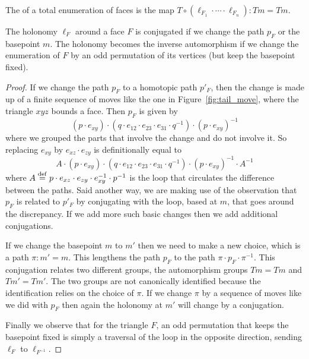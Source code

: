 \begin{mydef}
The  of a total enumeration of faces is the map \( T\circ(\ell_{F_1}\cdot\cdots\cdot\ell_{F_n}):Tm=Tm  \).
\end{mydef}

\begin{myprop}
The holonomy \( \ell_F \) around a face \( F \) is conjugated if we change the path \( p_F \) or the basepoint \( m \). The holonomy becomes the inverse automorphism if we change the enumeration of \( F \) by an odd permutation of its vertices (but keep the basepoint fixed).
\end{myprop}
\begin{proof}
If we change the path \( p_F \) to a homotopic path \( p'_F \), then the change is made up of a finite sequence of moves like the one in Figure~\ref{fig:tail_move}, where the triangle \( xyz \) bounds a face. Then \( p_{F} \) is given by 
\[ (p\cdot e_{xy})\cdot (q\cdot e_{12}\cdot e_{23}\cdot e_{31}\cdot q^{-1})\cdot (p\cdot e_{xy})^{-1}\] 
where we grouped the parts that involve the change and do not involve it. So replacing \( e_{xy} \) by \( e_{xz}\cdot e_{zy} \) is definitionally equal to 
\[ A\cdot (p\cdot e_{xy})\cdot (q\cdot e_{12}\cdot e_{23}\cdot e_{31}\cdot q^{-1})\cdot (p\cdot e_{xy})^{-1}\cdot A^{-1}\] 
where \( A\stackrel{\mathrm{def}}{=} p\cdot e_{xz}\cdot e_{zy}\cdot e_{xy}^{-1}\cdot p^{-1} \) is the loop that circulates the difference between the paths. Said another way, we are making use of the observation that \( p_F \) is related to \( p'_F \) by conjugating with the loop, based at \( m \), that goes around the discrepancy. If we add more such basic changes then we add additional conjugations.

If we change the basepoint \( m \) to \( m' \) then we need to make a new choice, which is a path \( \pi:m'=m \). This lengthens the path \( p_F \) to the path \( \pi\cdot p_F\cdot \pi^{-1} \). This conjugation relates two different groups, the automorphism groups \( Tm=Tm \) and \( Tm'=Tm' \). The two groups are not canonically identified because the identification relies on the choice of \( \pi \). If we change \( \pi \) by a sequence of moves like we did with \( p_F \) then again the holonomy at \( m' \) will change by a conjugation.

Finally we observe that for the triangle \( F \), an odd permutation that keeps the basepoint fixed is simply a traversal of the loop in the opposite direction, sending \( \ell_F \) to \( \ell_{F^{-1}} \).
\end{proof}

